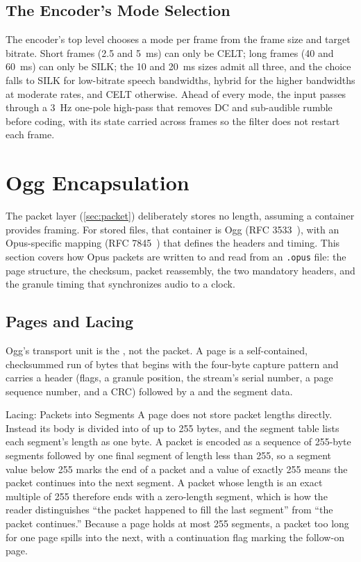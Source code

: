 \subsection{The Encoder's Mode Selection}\label{subsec:encode_auto}

The encoder's top level chooses a mode per frame from the frame size and target
bitrate. Short frames (2.5 and 5~ms) can only be CELT; long frames (40 and
60~ms) can only be SILK; the 10 and 20~ms sizes admit all three, and the choice
falls to SILK for low-bitrate speech bandwidths, hybrid for the
higher bandwidths
at moderate rates, and CELT otherwise. Ahead of every mode, the input passes
through a 3~Hz one-pole high-pass that removes DC and sub-audible rumble before
coding, with its state carried across frames so the filter does not restart each
frame.

\section{Ogg Encapsulation}\label{sec:ogg}

The packet layer (\cref{sec:packet}) deliberately stores no length, assuming a
container provides framing. For stored files, that container is Ogg
(RFC 3533~\cite{rfc3533}), with an Opus-specific mapping (RFC
7845~\cite{rfc7845})
that defines the headers and timing. This section covers how Opus packets are
written to and read from an \texttt{.opus} file: the page structure, the
checksum, packet reassembly, the two mandatory headers, and the granule timing
that synchronizes audio to a clock.

\subsection{Pages and Lacing}\label{subsec:ogg_pages}

Ogg's transport unit is the , not the packet. A page is a
self-contained, checksummed run of bytes that begins with the four-byte capture
pattern  and carries a header (flags, a granule position,
  the stream's
serial number, a page sequence number, and a CRC) followed by a  and the segment data.

\begin{concept}{Lacing: Packets into Segments}
  A page does not store packet lengths directly. Instead its body is
  divided into
   of up to 255 bytes, and the segment table lists each
  segment's length as one byte. A packet is encoded as a sequence of 255-byte
  segments followed by one final segment of length less than 255, so a segment
  value below 255 marks the end of a packet and a value of exactly 255 means the
  packet continues into the next segment. A packet whose length is an exact
  multiple of 255 therefore ends with a zero-length segment, which is how the
  reader distinguishes ``the packet happened to fill the last segment'' from
  ``the packet continues.'' Because a page holds at most 255 segments, a packet
  too long for one page spills into the next, with a continuation
  flag marking the
  follow-on page.
\end{concept}

